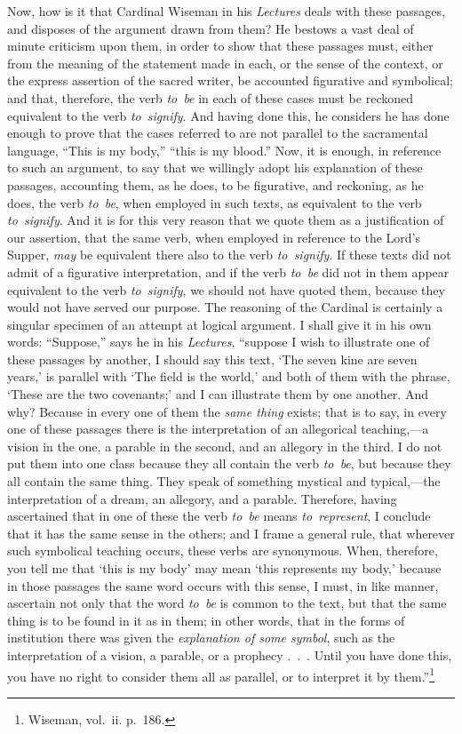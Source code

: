 \documentclass[
  english,
]{book}
\begin{document}
Now, how is it that Cardinal Wiseman in his \emph{Lectures} deals with these passages, and disposes of the argument drawn from them? He bestows a vast deal of minute criticism upon them, in order to show that these passages must, either from the meaning of the statement made in each, or the sense of the context, or the express assertion of the sacred writer, be accounted figurative and symbolical; and that, therefore, the verb \emph{to~be} in each of these cases must be reckoned equivalent to the verb \emph{to~signify}. And having done this, he considers he has done enough to prove that the cases referred to are not parallel to the sacramental language, ``This is my body,'' ``this is my blood.'' Now, it is enough, in reference to such an argument, to say that we willingly adopt his explanation of these passages, accounting them, as he does, to be figurative, and reckoning, as he does, the verb \emph{to~be}, when employed in such texts, as equivalent to the verb \emph{to~signify}. And it is for this very reason that we quote them as a justification of our assertion, that the same verb, when employed in reference to the Lord's Supper, \emph{may} be equivalent there also to the verb \emph{to~signify}. If these texts did not admit of a figurative interpretation, and if the verb \emph{to~be} did not in them appear equivalent to the verb \emph{to~signify}, we should not have quoted them, because they would not have served our purpose. The reasoning of the Cardinal is certainly a singular specimen of an attempt at logical argument. I shall give it in his own words: ``Suppose,'' says he in his \emph{Lectures}, ``suppose I wish to illustrate one of these passages by another, I should say this text, `The seven kine are seven years,' is parallel with `The field is the world,' and both of them with the phrase, `These are the two covenants;' and I can illustrate them by one another. And why? Because in every one of them the \emph{same thing} exists; that is to say, in every one of these passages there is the interpretation of an allegorical teaching,---a vision in the one, a parable in the second, and an allegory in the third. I do not put them into one class because they all contain the verb \emph{to~be}, but because they all contain the same thing. They speak of something mystical and typical,---the interpretation of a dream, an allegory, and a parable. Therefore, having ascertained that in one of these the verb \emph{to~be} means \emph{to~represent}, I conclude that it has the same sense in the others; and I frame a general rule, that wherever such symbolical teaching occurs, these verbs are synonymous. When, therefore, you tell me that `this is my body' may mean `this represents my body,' because in those passages the same word occurs with this sense, I must, in like manner, ascertain not only that the word \emph{to~be} is common to the text, but that the same thing is to be found in it as in them; in other words, that in the forms of institution there was given the \emph{explanation of some symbol}, such as the interpretation of a vision, a parable, or a prophecy .~.~. Until you have done this, you have no right to consider them all as parallel, or to interpret it by them.''\footnote{Wiseman, vol.~ii. p.~186.}
\end{document}
